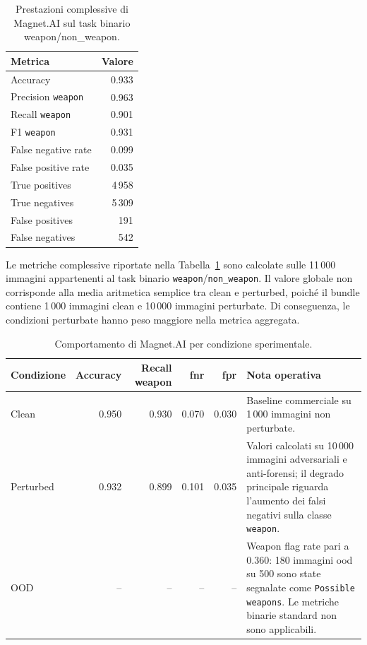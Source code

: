 \begin{table}[H]
\centering
\caption{Prestazioni complessive di Magnet.AI sul task binario weapon/non\_weapon.}
\label{tab:results-magnet-global-metrics}
\small
\begin{tabular}{lr}
\toprule
\textbf{Metrica} & \textbf{Valore} \\
\midrule
Accuracy & 0.933 \\
Precision \texttt{weapon} & 0.963 \\
Recall \texttt{weapon} & 0.901 \\
F1 \texttt{weapon} & 0.931 \\
False negative rate & 0.099 \\
False positive rate & 0.035 \\
True positives & 4\,958 \\
True negatives & 5\,309 \\
False positives & 191 \\
False negatives & 542 \\
\bottomrule
\end{tabular}
\end{table}

Le metriche complessive riportate nella Tabella~\ref{tab:results-magnet-global-metrics}
sono calcolate sulle 11\,000 immagini appartenenti al task binario
\texttt{weapon}/\texttt{non\_weapon}. Il valore globale non corrisponde alla
media aritmetica semplice tra clean e perturbed, poiché il bundle contiene
1\,000 immagini clean e 10\,000 immagini perturbate. Di conseguenza, le
condizioni perturbate hanno peso maggiore nella metrica aggregata.

\begin{table}[H]
\centering
\caption{Comportamento di Magnet.AI per condizione sperimentale.}
\label{tab:results-magnet-condition-metrics}
\small
\begin{tabularx}{\textwidth}{@{}l r r r r X@{}}
\toprule
\textbf{Condizione} &
\textbf{Accuracy} &
\textbf{Recall weapon} &
\textbf{\gls{fnr}} &
\textbf{\gls{fpr}} &
\textbf{Nota operativa} \\
\midrule

Clean &
0.950 &
0.930 &
0.070 &
0.030 &
Baseline commerciale su 1\,000 immagini non perturbate. \\

Perturbed &
0.932 &
0.899 &
0.101 &
0.035 &
Valori calcolati su 10\,000 immagini adversariali e anti-forensi; il degrado
principale riguarda l'aumento dei falsi negativi sulla classe \texttt{weapon}. \\

OOD &
-- &
-- &
-- &
-- &
Weapon flag rate pari a 0.360: 180 immagini \gls{ood} su 500 sono state
segnalate come \texttt{Possible weapons}. Le metriche binarie standard non sono
applicabili. \\

\bottomrule
\end{tabularx}
\end{table}

